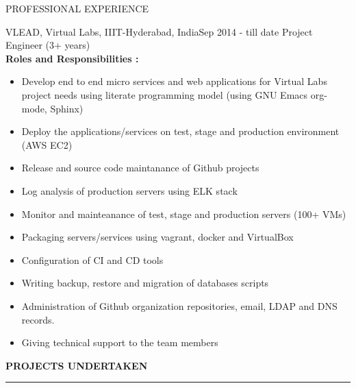 \documentclass{resume} %
\begin{document}
\begin{rSection}{PROFESSIONAL EXPERIENCE}

   \begin{rSubsection}
    {VLEAD, Virtual Labs, IIIT-Hyderabad, India}{Sep 2014 - till date}
    {Project Engineer} {(3+ years)} \hfill 
    \\    
    \textbf{Roles and Responsibilities :}
    \begin{itemize}
      
    \item Develop end to end micro services and web applications for
      Virtual Labs project needs using literate programming model
      (using GNU Emacs org-mode, Sphinx)

    \item Deploy the applications/services on test, stage and
      production environment (AWS EC2)

    \item Release and source code maintanance of Github projects

    \item Log analysis of production servers using ELK stack      
      
    \item Monitor and mainteanance of test, stage and production
      servers (100+ VMs)
      
    \item Packaging servers/services using vagrant,
      docker and VirtualBox

    \item Configuration of CI and CD tools
      
    \item Writing backup, restore and migration of databases scripts

    \item Administration of Github organization repositories,
      email, LDAP and DNS records.

    \item Giving technical support to the team members
    \end{itemize}

    \hfill



\textbf{PROJECTS UNDERTAKEN }
\sectionlineskip \hrule


\end{rSubsection}
\end{rSection}
\end{document}
